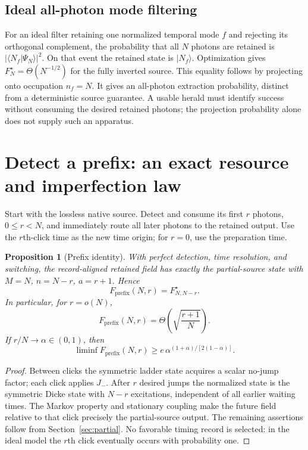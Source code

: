 \documentclass[11pt,a4paper]{article}
\newtheorem{proposition}[theorem]{Proposition}
\newcommand{\Fock}[2]{\lvert #1_{#2}\rangle}
\begin{document}
\subsection{Ideal all-photon mode filtering}
For an ideal filter retaining one normalized temporal mode \(f\)
and rejecting its orthogonal complement, the probability that
all \(N\) photons are retained is
\(|\langle N_f|\Psi_N\rangle|^2\). On that event the retained
state is \(\Fock{N}{f}\). Optimization gives
\(F_N^\star=\Theta(N^{-1/2})\) for the fully inverted source.
This equality follows by projecting onto occupation \(n_f=N\).
It gives an all-photon extraction probability, distinct from a
deterministic source guarantee. A usable herald must identify
success without consuming the desired retained photons; the
projection probability alone does not supply such an apparatus.

\section{Detect a prefix: an exact resource and imperfection law}
\label{sec:prefix}

Start with the lossless native source. Detect and consume its first
\(r\) photons, \(0\le r<N\), and immediately route all later photons
to the retained output. Use the \(r\)th-click time as the new time
origin; for \(r=0\), use the preparation time.

\begin{proposition}[Prefix identity]
With perfect detection, time resolution, and switching, the
record-aligned retained field has exactly the partial-source state
with \(M=N\), \(n=N-r\), \(a=r+1\). Hence
\begin{equation}
 F_{\mathrm{prefix}}(N,r)=F_{N,N-r}^\star.
 \label{eq:prefixidentity}
\end{equation}
In particular, for \(r=o(N)\),
\begin{equation}
 F_{\mathrm{prefix}}(N,r)
 =\Theta\!\left(\sqrt{\frac{r+1}{N}}\right).
 \label{eq:prefixlaw}
\end{equation}
If \(r/N\to\alpha\in(0,1)\), then
\begin{equation}
 \liminf F_{\mathrm{prefix}}(N,r)
 \ge e\,\alpha^{(1+\alpha)/[2(1-\alpha)]}.
 \label{eq:prefixfraction}
\end{equation}
\end{proposition}
\begin{proof}
Between clicks the symmetric ladder state acquires a scalar
no-jump factor; each click applies \(J_-\). After \(r\) desired
jumps the normalized state is the symmetric Dicke state with
\(N-r\) excitations, independent of all earlier waiting times.
The Markov property and stationary coupling make the future field
relative to that click precisely the partial-source output.
The remaining assertions follow from Section~\ref{sec:partial}. No favorable timing record is selected: in the ideal
model the \(r\)th click eventually occurs with probability one.
\end{proof}
\end{document}
